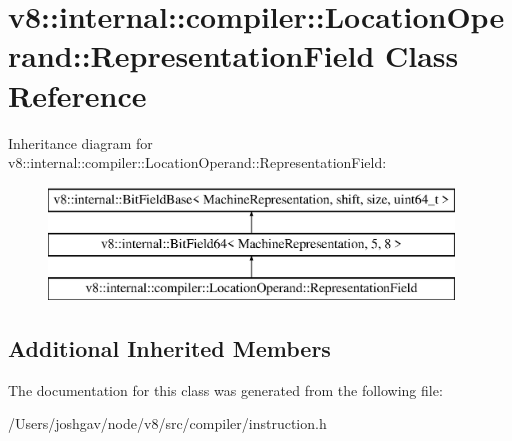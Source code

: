 \hypertarget{classv8_1_1internal_1_1compiler_1_1_location_operand_1_1_representation_field}{}\section{v8\+:\+:internal\+:\+:compiler\+:\+:Location\+Operand\+:\+:Representation\+Field Class Reference}
\label{classv8_1_1internal_1_1compiler_1_1_location_operand_1_1_representation_field}
Inheritance diagram for v8\+:\+:internal\+:\+:compiler\+:\+:Location\+Operand\+:\+:Representation\+Field\+:\begin{figure}[H]
\begin{center}
\leavevmode
\includegraphics[height=3.000000cm]{classv8_1_1internal_1_1compiler_1_1_location_operand_1_1_representation_field}
\end{center}
\end{figure}
\subsection*{Additional Inherited Members}


The documentation for this class was generated from the following file\+:\begin{DoxyCompactItemize}
\item 
/\+Users/joshgav/node/v8/src/compiler/instruction.\+h\end{DoxyCompactItemize}

